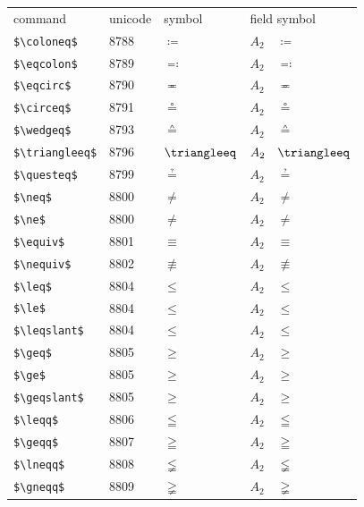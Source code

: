 ﻿\documentclass{article}
\begin{document}
\begin{table}
\begin{center}
\begin{tabular}{llll}
 command               & unicode & symbol         & field symbol\\
 \verb#$\coloneq$#     & 8788    & $\coloneq$     & $A_2\quad \coloneq$\\
 \verb#$\eqcolon$#     & 8789    & $\eqcolon$     & $A_2\quad \eqcolon$\\
 \verb#$\eqcirc$#      & 8790    & $\eqcirc$      & $A_2\quad \eqcirc$\\
 \verb#$\circeq$#      & 8791    & $\circeq$      & $A_2\quad \circeq$\\
 \verb#$\wedgeq$#      & 8793    & $\wedgeq$      & $A_2\quad \wedgeq$\\
 \verb#$\triangleeq$#  & 8796    & $\triangleeq$  & $A_2\quad \triangleeq$\\
 \verb#$\questeq$#     & 8799    & $\questeq$     & $A_2\quad \questeq$\\
 \verb#$\neq$#         & 8800    & $\neq$         & $A_2\quad \neq$\\
 \verb#$\ne$#          & 8800    & $\ne$          & $A_2\quad \ne$\\
 \verb#$\equiv$#       & 8801    & $\equiv$       & $A_2\quad \equiv$\\
 \verb#$\nequiv$#      & 8802    & $\nequiv$      & $A_2\quad \nequiv$\\
 \verb#$\leq$#         & 8804    & $\leq$         & $A_2\quad \leq$\\
 \verb#$\le$#          & 8804    & $\le$          & $A_2\quad \le$\\
 \verb#$\leqslant$#    & 8804    & $\leqslant$    & $A_2\quad \leqslant$\\
 \verb#$\geq$#         & 8805    & $\geq$         & $A_2\quad \geq$\\
 \verb#$\ge$#          & 8805    & $\ge$          & $A_2\quad \ge$\\
 \verb#$\geqslant$#    & 8805    & $\geqslant$    & $A_2\quad \geqslant$\\
 \verb#$\leqq$#        & 8806    & $\leqq$        & $A_2\quad \leqq$\\
 \verb#$\geqq$#        & 8807    & $\geqq$        & $A_2\quad \geqq$\\
 \verb#$\lneqq$#       & 8808    & $\lneqq$       & $A_2\quad \lneqq$\\
 \verb#$\gneqq$#       & 8809    & $\gneqq$       & $A_2\quad \gneqq$\\

\end{tabular}
\end{center}
\end{table}
\end{document}
